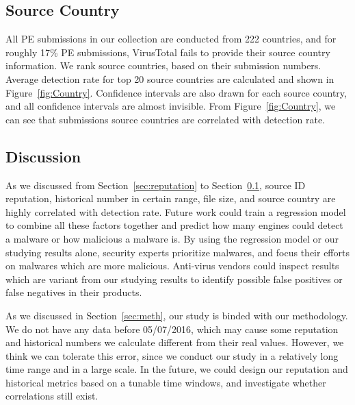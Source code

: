 \subsection{Source Country}
\label{sec:country}

All PE submissions in our collection are conducted from 222 countries, 
and for roughly 17\% PE submissions, 
VirusTotal fails to provide their source country information. 
We rank source countries, based on their submission numbers. 
Average detection rate for top 20 source countries are calculated and shown in 
Figure~\ref{fig:Country}. 
Confidence intervals are also drawn for each source country, 
and all confidence intervals are almost invisible. 
From Figure~\ref{fig:Country}, 
we can see that submissions source countries are correlated with detection rate.

\subsection{Discussion}

As we discussed from Section~\ref{sec:reputation} to Section~\ref{sec:country}, 
source ID reputation, historical number in certain range, file size, 
and source country are highly correlated with detection rate. 
Future work could train a regression model to combine all these factors together and 
predict how many engines could detect a malware or how malicious a malware is. 
By using the regression model or our studying results alone, 
security experts prioritize malwares, and focus their efforts on malwares which are more malicious. 
Anti-virus vendors could inspect results which are variant from our studying results 
to identify possible false positives or false negatives in their products. 

As we discussed in Section~\ref{sec:meth}, our study is binded with our methodology.
We do not have any data before 05/07/2016, 
which may cause some reputation and historical numbers 
we calculate different from their real values. 
However, we think we can tolerate this error, 
since we conduct our study in a relatively long time range and in a large scale. 
In the future, we could design our reputation and historical metrics based on a tunable time windows, and investigate whether correlations still exist.   
